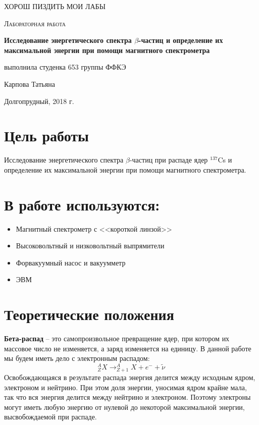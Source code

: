 \documentclass[a4paper]{article}
\begin{document}
\begin{titlepage}
	\centering
	\vspace{5cm}
	{\scshape{} ХОРОШ ПИЗДИТЬ МОИ ЛАБЫ\par}
	\vspace{4cm}
	{\scshape\Large Лабораторная работа \par}
	\vspace{1cm}
	{\huge\bfseries Исследование энергетического спектра $\beta$-частиц и определение их максимальной энергии при помощи магнитного спектрометра \par}
	\vspace{1cm}
	\vfill
\begin{flushright}
	{\large выполнила студенка 653 группы ФФКЭ}\par
	\vspace{0.3cm}
	{\LARGE Карпова Татьяна} \par


\end{flushright}
	

	\vfill

	Долгопрудный, 2018 г.
\end{titlepage}

\section{Цель работы}
Исследование энергетического спектра $\beta$-частиц при распаде ядер $^{137}$Cs и определение их максимальной энергии при помощи магнитного спектрометра. 

\section {В работе используются:}
\begin{itemize}
    \item Магнитный спектрометр с <<короткой линзой>>
    \item Высоковольтный и низковольтный выпрямители
    \item Форвакуумный насос и вакуумметр
    \item ЭВМ
\end{itemize}

\section{Теоретические положения}

\textbf{Бета-распад} --  это самопроизвольное превращение ядер, при котором их массовое число не изменяется, а заряд изменяется на единицу. В данной работе мы будем иметь дело с электронным распадом:
		\begin{equation}
		    _{Z}^{A}X \rightarrow _{Z+1}^{A}X + e^{-} + \widetilde{\nu}
		\end{equation}
		Освобождающаяся в результате распада энергия делится между исходным ядром, электроном и нейтрино. При этом доля энергии, уносимая ядром крайне мала, так что вся энергия делится между нейтрино и электроном. Поэтому электроны могут иметь любую энергию от нулевой до некоторой максимальной энергии, высвобождаемой при распаде.
		
\end{document}
